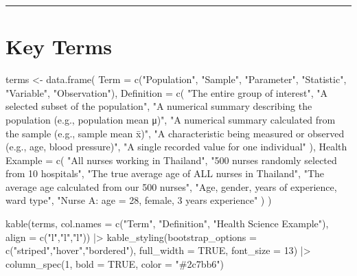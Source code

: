 \documentclass[
  12pt,
  letterpaper,
]{book}
\newenvironment{Shaded}{\begin{snugshade}}{\end{snugshade}}
\newcommand{\AttributeTok}[1]{\textcolor[rgb]{0.40,0.45,0.13}{#1}}
\newcommand{\ConstantTok}[1]{\textcolor[rgb]{0.56,0.35,0.01}{#1}}
\newcommand{\DecValTok}[1]{\textcolor[rgb]{0.68,0.00,0.00}{#1}}
\newcommand{\FunctionTok}[1]{\textcolor[rgb]{0.28,0.35,0.67}{#1}}
\newcommand{\NormalTok}[1]{\textcolor[rgb]{0.00,0.23,0.31}{#1}}
\newcommand{\OtherTok}[1]{\textcolor[rgb]{0.00,0.23,0.31}{#1}}
\newcommand{\SpecialCharTok}[1]{\textcolor[rgb]{0.37,0.37,0.37}{#1}}
\newcommand{\StringTok}[1]{\textcolor[rgb]{0.13,0.47,0.30}{#1}}
\begin{document}
\begin{center}\rule{0.5\linewidth}{0.5pt}\end{center}

\section{Key Terms}\label{key-terms}

\begin{Shaded}
\begin{Highlighting}[]
\NormalTok{terms }\OtherTok{\textless{}{-}} \FunctionTok{data.frame}\NormalTok{(}
  \AttributeTok{Term =} \FunctionTok{c}\NormalTok{(}\StringTok{"Population"}\NormalTok{,}
           \StringTok{"Sample"}\NormalTok{,}
           \StringTok{"Parameter"}\NormalTok{,}
           \StringTok{"Statistic"}\NormalTok{,}
           \StringTok{"Variable"}\NormalTok{,}
           \StringTok{"Observation"}\NormalTok{),}
  \AttributeTok{Definition =} \FunctionTok{c}\NormalTok{(}
    \StringTok{"The entire group of interest"}\NormalTok{,}
    \StringTok{"A selected subset of the population"}\NormalTok{,}
    \StringTok{"A numerical summary describing the population (e.g., population mean μ)"}\NormalTok{,}
    \StringTok{"A numerical summary calculated from the sample (e.g., sample mean x̄)"}\NormalTok{,}
    \StringTok{"A characteristic being measured or observed (e.g., age, blood pressure)"}\NormalTok{,}
    \StringTok{"A single recorded value for one individual"}
\NormalTok{  ),}
  \StringTok{\textasciigrave{}}\AttributeTok{Health Example}\StringTok{\textasciigrave{}} \OtherTok{=} \FunctionTok{c}\NormalTok{(}
    \StringTok{"All nurses working in Thailand"}\NormalTok{,}
    \StringTok{"500 nurses randomly selected from 10 hospitals"}\NormalTok{,}
    \StringTok{"The true average age of ALL nurses in Thailand"}\NormalTok{,}
    \StringTok{"The average age calculated from our 500 nurses"}\NormalTok{,}
    \StringTok{"Age, gender, years of experience, ward type"}\NormalTok{,}
    \StringTok{"Nurse A: age = 28, female, 3 years experience"}
\NormalTok{  )}
\NormalTok{)}

\FunctionTok{kable}\NormalTok{(terms, }\AttributeTok{col.names =} \FunctionTok{c}\NormalTok{(}\StringTok{"Term"}\NormalTok{, }\StringTok{"Definition"}\NormalTok{, }\StringTok{"Health Science Example"}\NormalTok{),}
      \AttributeTok{align =} \FunctionTok{c}\NormalTok{(}\StringTok{"l"}\NormalTok{,}\StringTok{"l"}\NormalTok{,}\StringTok{"l"}\NormalTok{)) }\SpecialCharTok{|\textgreater{}}
  \FunctionTok{kable\_styling}\NormalTok{(}\AttributeTok{bootstrap\_options =} \FunctionTok{c}\NormalTok{(}\StringTok{"striped"}\NormalTok{,}\StringTok{"hover"}\NormalTok{,}\StringTok{"bordered"}\NormalTok{),}
                \AttributeTok{full\_width =} \ConstantTok{TRUE}\NormalTok{, }\AttributeTok{font\_size =} \DecValTok{13}\NormalTok{) }\SpecialCharTok{|\textgreater{}}
  \FunctionTok{column\_spec}\NormalTok{(}\DecValTok{1}\NormalTok{, }\AttributeTok{bold =} \ConstantTok{TRUE}\NormalTok{, }\AttributeTok{color =} \StringTok{"\#2c7bb6"}\NormalTok{)}
\end{Highlighting}
\end{Shaded}
\end{document}
